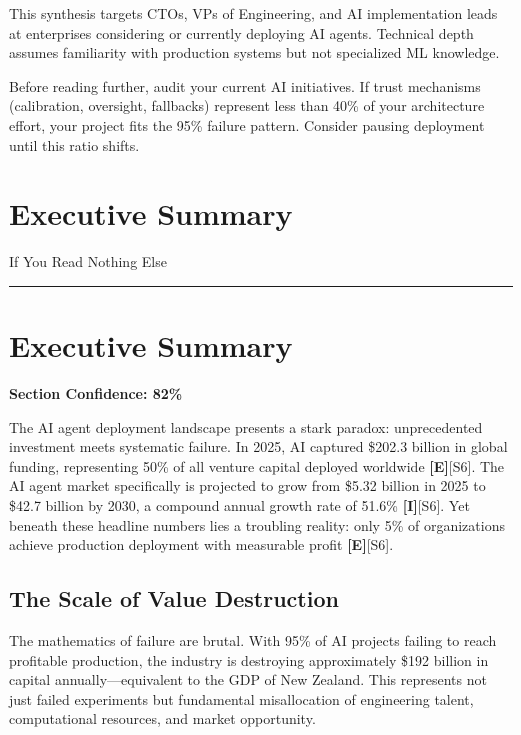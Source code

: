\documentclass[a4paper,11pt]{article}
\newcommand{\ssubtitle}[1]{%
  \par\textcolor{subtitle}{\fontsize{12}{16}\selectfont #1}%
  \par\vspace{2pt}\textcolor{border}{\rule{\linewidth}{0.4pt}}\vspace{12pt}%
}
\newcommand{\elabel}{\textbf{\textcolor{ecolor}{[E]}}}
\newcommand{\ilabel}{\textbf{\textcolor{icolor}{[I]}}}
\begin{document}
This synthesis targets CTOs, VPs of Engineering, and AI implementation leads at enterprises considering or currently deploying AI agents. Technical depth assumes familiarity with production systems but not specialized ML knowledge.


\begin{decisionbox}
Before reading further, audit your current AI initiatives. If trust mechanisms (calibration, oversight, fallbacks) represent less than 40\% of your architecture effort, your project fits the 95\% failure pattern. Consider pausing deployment until this ratio shifts.
\end{decisionbox}

\clearpage
\section{Executive Summary}
\ssubtitle{If You Read Nothing Else}

\section{Executive Summary}

\textbf{Section Confidence: 82\%}\par

The AI agent deployment landscape presents a stark paradox: unprecedented investment meets systematic failure. In 2025, AI captured \$202.3 billion in global funding, representing 50\% of all venture capital deployed worldwide \elabel{}\textcolor{primary}{[S6]}. The AI agent market specifically is projected to grow from \$5.32 billion in 2025 to \$42.7 billion by 2030, a compound annual growth rate of 51.6\% \ilabel{}\textcolor{primary}{[S6]}. Yet beneath these headline numbers lies a troubling reality: only 5\% of organizations achieve production deployment with measurable profit \elabel{}\textcolor{primary}{[S6]}.


\subsection{The Scale of Value Destruction}

The mathematics of failure are brutal. With 95\% of AI projects failing to reach profitable production, the industry is destroying approximately \$192 billion in capital annually—equivalent to the GDP of New Zealand. This represents not just failed experiments but fundamental misallocation of engineering talent, computational resources, and market opportunity.
\end{document}
